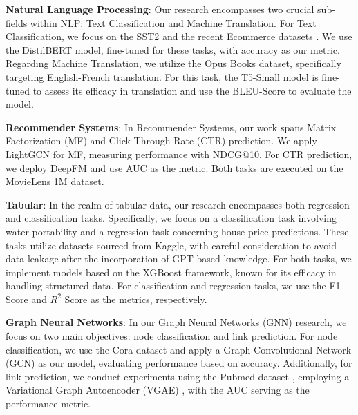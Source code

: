 \documentclass{article}
\begin{document}
\textbf{Natural Language Processing}: Our research encompasses two crucial sub-fields within NLP: Text Classification and Machine Translation. For Text Classification, we focus on the SST2 \cite{socher-etal-2013-recursive} and the recent Ecommerce datasets \cite{Shahane_2023}. We use the DistilBERT \cite{Sanh2019DistilBERTAD} model, fine-tuned for these tasks, with accuracy as our metric. Regarding Machine Translation, we utilize the Opus Books \cite{zhang2020improving} dataset, specifically targeting English-French translation. For this task, the T5-Small \cite{2020t5} model is fine-tuned to assess its efficacy in translation and use the BLEU-Score to evaluate the model.

\textbf{Recommender Systems}: In Recommender Systems, our work spans Matrix Factorization (MF) and Click-Through Rate (CTR) prediction. We apply LightGCN \cite{he2020lightgcn} for MF, measuring performance with NDCG@10. For CTR prediction, we deploy DeepFM \cite{guo2017deepfm} and use AUC as the metric. Both tasks are executed on the MovieLens 1M \cite{10.1145/2827872} dataset.

\textbf{Tabular}: In the realm of tabular data, our research encompasses both regression and classification tasks. Specifically, we focus on a classification task involving water portability \cite{Tharmalingam_2023} and a regression task concerning house price \cite{Imran_2023} predictions. These tasks utilize datasets sourced from Kaggle, with careful consideration to avoid data leakage after the incorporation of GPT-based knowledge. For both tasks, we implement models based on the XGBoost \cite{chen2016xgboost} framework, known for its efficacy in handling structured data. For classification and regression tasks, we use the F1 Score and \(R^2\) Score as the metrics, respectively.

\textbf{Graph Neural Networks}: In our Graph Neural Networks (GNN) research, we focus on two main objectives: node classification and link prediction. For node classification, we use the Cora dataset \cite{sen2008collective} and apply a Graph Convolutional Network (GCN) \cite{kipf2016semi} as our model, evaluating performance based on accuracy. Additionally, for link prediction, we conduct experiments using the Pubmed dataset \cite{sen2008collective}, employing a Variational Graph Autoencoder (VGAE) \cite{kipf2016variational}, with the AUC serving as the performance metric.
\end{document}
